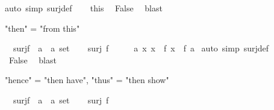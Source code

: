 \begin{isabellebody}
{\isacharparenleft}{\kern0pt}auto\ simp{\isacharcolon}{\kern0pt}\ surj{\isacharunderscore}{\kern0pt}def{\isacharparenright}{\kern0pt}\isanewline
\ \ \isamarkupfalse%
\ this\ \isamarkupfalse%
\ {\isachardoublequoteopen}False{\isachardoublequoteclose}\ \isamarkupfalse%
\ blast\isanewline
{}\isamarkupfalse%
%
\endisatagproof
{\isafoldproof}%
%
\isadelimproof
%
\endisadelimproof
%
\begin{isamarkuptext}%
"then" = "from this"%
\end{isamarkuptext}\isamarkuptrue%
\isamarkupfalse%
\ {\isachardoublequoteopen}{\isasymnot}\ surj{\isacharparenleft}{\kern0pt}f\ {\isacharcolon}{\kern0pt}{\isacharcolon}{\kern0pt}\ {\isacharprime}{\kern0pt}a\ {\isasymRightarrow}\ {\isacharprime}{\kern0pt}a\ set{\isacharparenright}{\kern0pt}{\isachardoublequoteclose}\isanewline
%
\isadelimproof
%
\endisadelimproof
%
\isatagproof
{}\isamarkupfalse%
\isanewline
\ \ \isamarkupfalse%
\ {\isachardoublequoteopen}surj\ f{\isachardoublequoteclose}\isanewline
\ \ \isamarkupfalse%
\ \isamarkupfalse%
\ {\isachardoublequoteopen}{\isasymexists}a{\isachardot}{\kern0pt}\ {\isacharbraceleft}{\kern0pt}x{\isachardot}{\kern0pt}\ x\ {\isasymnotin}\ f\ x{\isacharbraceright}{\kern0pt}\ {\isacharequal}{\kern0pt}\ f\ a{\isachardoublequoteclose}\ \isamarkupfalse%
{\isacharparenleft}{\kern0pt}auto\ simp{\isacharcolon}{\kern0pt}\ surj{\isacharunderscore}{\kern0pt}def{\isacharparenright}{\kern0pt}\isanewline
\ \ \isamarkupfalse%
\ \isamarkupfalse%
\ {\isachardoublequoteopen}False{\isachardoublequoteclose}\ \isamarkupfalse%
\ blast\isanewline
{}\isamarkupfalse%
%
\endisatagproof
{\isafoldproof}%
%
\isadelimproof
%
\endisadelimproof
%
\begin{isamarkuptext}%
"hence" = "then have", "thus" = "then show"%
\end{isamarkuptext}\isamarkuptrue%
\isamarkupfalse%
\ {\isachardoublequoteopen}{\isasymnot}\ surj{\isacharparenleft}{\kern0pt}f\ {\isacharcolon}{\kern0pt}{\isacharcolon}{\kern0pt}\ {\isacharprime}{\kern0pt}a\ {\isasymRightarrow}\ {\isacharprime}{\kern0pt}a\ set{\isacharparenright}{\kern0pt}{\isachardoublequoteclose}\isanewline
%
\isadelimproof
%
\endisadelimproof
%
\isatagproof
{}\isamarkupfalse%
\isanewline
\ \ \isamarkupfalse%
\ {\isachardoublequoteopen}surj\ f{\isachardoublequoteclose}\isanewline

\end{isabellebody}
